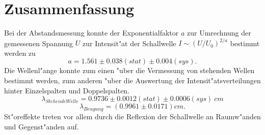 \documentclass[12pt,a4paper]{article}
\begin{document}
\section{Zusammenfassung}
Bei der Abstandsmessung konnte der Exponentialfaktor $a$ zur Umrechnung der gemessenen Spannung $U$ zur Intensit"at der Schallwelle $I\sim(U/U_0)^{2/a}$ bestimmt werden zu
\begin{equation}
a=1.561\pm0.038(stat)\pm0.004(sys).
\end{equation}
Die Wellenl"ange konnte zum einen "uber die Vermessung von stehenden Wellen bestimmt werden, zum anderen "uber die Auswertung der Intensit"atsverteilungen hinter Einzelspalten und Doppelspalten.
\begin{equation}
\lambda_{Stehende Welle}=0.9736\pm0.0012(stat)\pm0.0006(sys)\ cm
\end{equation}
\begin{equation}
\lambda_{Beugung} = (0.9961 \pm 0.0171) cm.
\end{equation}
St"oreffekte treten vor allem durch die Reflexion der Schallwelle an Raumw"anden und Gegenst"anden auf.
\end{document}

